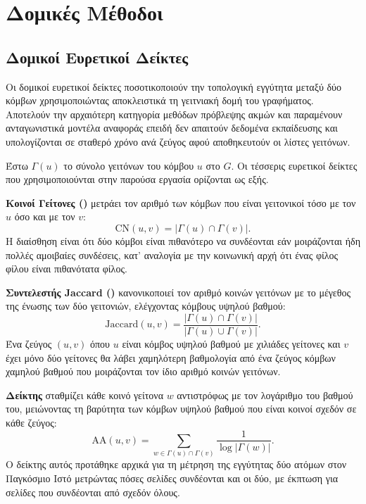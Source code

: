 \section{Δομικές Μέθοδοι}
\label{sec:structural-methods}

\subsection{Δομικοί Ευρετικοί Δείκτες}
\label{subsec:structural-heuristics}

Οι δομικοί ευρετικοί δείκτες ποσοτικοποιούν την τοπολογική εγγύτητα μεταξύ δύο κόμβων
χρησιμοποιώντας αποκλειστικά τη γειτνιακή δομή του γραφήματος.
Αποτελούν την αρχαιότερη
κατηγορία μεθόδων πρόβλεψης ακμών και παραμένουν ανταγωνιστικά μοντέλα αναφοράς
επειδή δεν απαιτούν δεδομένα εκπαίδευσης και υπολογίζονται σε σταθερό χρόνο ανά
ζεύγος αφού αποθηκευτούν οι λίστες γειτόνων.

Έστω $\Gamma(u)$ το σύνολο γειτόνων του κόμβου $u$ στο $G$.
Οι τέσσερις
ευρετικοί δείκτες που χρησιμοποιούνται στην παρούσα εργασία ορίζονται ως εξής.

\textbf{Κοινοί Γείτονες ()} \cite{newman2001clustering} μετράει τον αριθμό των κόμβων
που είναι γειτονικοί τόσο με τον $u$ όσο και με τον $v$:
\begin{equation}
    \mathrm{CN}(u, v) = |\Gamma(u) \cap \Gamma(v)|.
    \label{eq:cn}
\end{equation}
Η διαίσθηση είναι ότι δύο κόμβοι είναι πιθανότερο να συνδέονται εάν μοιράζονται ήδη
πολλές αμοιβαίες συνδέσεις, κατ' αναλογία με την κοινωνική αρχή ότι ένας φίλος
φίλου είναι πιθανότατα φίλος.

\textbf{Συντελεστής Jaccard ()} \cite{jaccard1912distribution} κανονικοποιεί τον αριθμό
κοινών γειτόνων με το μέγεθος της ένωσης των δύο γειτονιών, ελέγχοντας κόμβους
υψηλού βαθμού:
\begin{equation}
    \mathrm{Jaccard}(u, v) = \frac{|\Gamma(u) \cap \Gamma(v)|}{|\Gamma(u) \cup \Gamma(v)|}.
    \label{eq:jaccard}
\end{equation}
Ένα ζεύγος $(u, v)$ όπου $u$ είναι κόμβος υψηλού βαθμού με χιλιάδες γείτονες και $v$ έχει
μόνο δύο γείτονες θα λάβει χαμηλότερη βαθμολογία  από ένα ζεύγος κόμβων
χαμηλού βαθμού που μοιράζονται τον ίδιο αριθμό κοινών γειτόνων.

\textbf{Δείκτης } \cite{adamic2003friends} σταθμίζει κάθε κοινό γείτονα
$w$ αντιστρόφως με τον λογάριθμο του βαθμού του, μειώνοντας τη βαρύτητα των κόμβων
υψηλού βαθμού που είναι κοινοί σχεδόν σε κάθε ζεύγος:
\begin{equation}
    \mathrm{AA}(u, v) = \sum_{w \in \Gamma(u) \cap \Gamma(v)} \frac{1}{\log |\Gamma(w)|}.
    \label{eq:aa}
\end{equation}
Ο δείκτης αυτός προτάθηκε αρχικά για τη μέτρηση της εγγύτητας δύο ατόμων στον
Παγκόσμιο Ιστό μετρώντας πόσες σελίδες συνδέονται και οι δύο, με έκπτωση για
σελίδες που συνδέονται από σχεδόν όλους.


